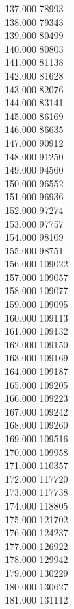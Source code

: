 { 137.000	78993 \\
 138.000	79343 \\
 139.000	80499 \\
 140.000	80803 \\
 141.000	81138 \\
 142.000	81628 \\
 143.000	82076 \\
 144.000	83141 \\
 145.000	86169 \\
 146.000	86635 \\
 147.000	90912 \\
 148.000	91250 \\
 149.000	94560 \\
 150.000	96552 \\
 151.000	96936 \\
 152.000	97274 \\
 153.000	97757 \\
 154.000	98109 \\
 155.000	98751 \\
 156.000	109022 \\
 157.000	109057 \\
 158.000	109077 \\
 159.000	109095 \\
 160.000	109113 \\
 161.000	109132 \\
 162.000	109150 \\
 163.000	109169 \\
 164.000	109187 \\
 165.000	109205 \\
 166.000	109223 \\
 167.000	109242 \\
 168.000	109260 \\
 169.000	109516 \\
 170.000	109958 \\
 171.000	110357 \\
 172.000	117720 \\
 173.000	117738 \\
 174.000	118805 \\
 175.000	121702 \\
 176.000	124237 \\
 177.000	126922 \\
 178.000	129942 \\
 179.000	130229 \\
 180.000	130627 \\
 181.000	131112 \\
}
